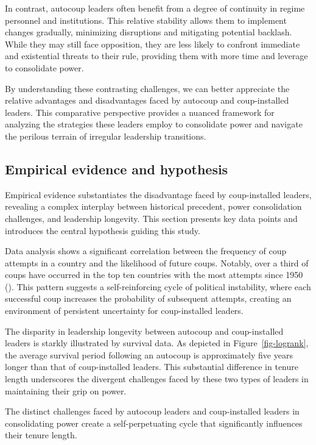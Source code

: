 \documentclass[
  12pt,
]{report}
\begin{document}
In contrast, autocoup leaders often benefit from a degree of continuity
in regime personnel and institutions. This relative stability allows
them to implement changes gradually, minimizing disruptions and
mitigating potential backlash. While they may still face opposition,
they are less likely to confront immediate and existential threats to
their rule, providing them with more time and leverage to consolidate
power.

By understanding these contrasting challenges, we can better appreciate
the relative advantages and disadvantages faced by autocoup and
coup-installed leaders. This comparative perspective provides a nuanced
framework for analyzing the strategies these leaders employ to
consolidate power and navigate the perilous terrain of irregular
leadership transitions.

\subsection{Empirical evidence and
hypothesis}\label{empirical-evidence-and-hypothesis}

Empirical evidence substantiates the disadvantage faced by
coup-installed leaders, revealing a complex interplay between historical
precedent, power consolidation challenges, and leadership longevity.
This section presents key data points and introduces the central
hypothesis guiding this study.

Data analysis shows a significant correlation between the frequency of
coup attempts in a country and the likelihood of future coups. Notably,
over a third of coups have occurred in the top ten countries with the
most attempts since 1950 (). This pattern suggests a self-reinforcing cycle of political
instability, where each successful coup increases the probability of
subsequent attempts, creating an environment of persistent uncertainty
for coup-installed leaders.

The disparity in leadership longevity between autocoup and
coup-installed leaders is starkly illustrated by survival data. As
depicted in Figure~\ref{fig-logrank}, the average survival period
following an autocoup is approximately five years longer than that of
coup-installed leaders. This substantial difference in tenure length
underscores the divergent challenges faced by these two types of leaders
in maintaining their grip on power.

The distinct challenges faced by autocoup leaders and coup-installed
leaders in consolidating power create a self-perpetuating cycle that
significantly influences their tenure length.
\end{document}
